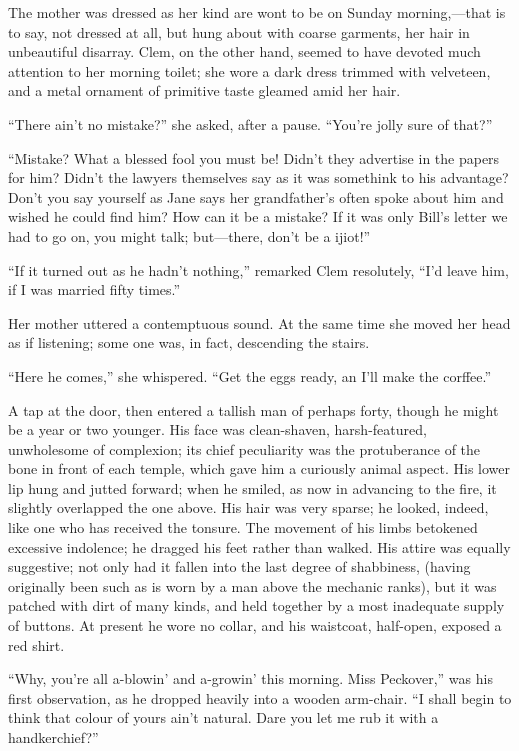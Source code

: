 The mother was dressed as her kind are wont to be on Sunday
morning,---that is to say, not dressed at all, but hung about with
coarse garments, her hair in unbeautiful disarray. Clem, on the other
hand, seemed to have devoted much attention to her morning toilet; she
wore a dark dress trimmed with {}velveteen, and a metal ornament of
primitive taste gleamed amid her hair.

``There ain't no mistake?'' she asked, after a pause. ``You're jolly
sure of that?''

``Mistake? What a blessed fool you must be! Didn't they advertise in the
papers for him? Didn't the lawyers themselves say as it was somethink to
his advantage? Don't you say yourself as Jane says her grandfather's
often spoke about him and wished he could find him? How can it be a
mistake? If it was only Bill's letter we had to go on, you might talk;
but---there, don't be a ijiot!''

``If it turned out as he hadn't nothing,'' remarked Clem resolutely,
``I'd leave him, if I was married fifty times.''

Her mother uttered a contemptuous sound. At the same time she moved her
head as if listening; some one was, in fact, descending the stairs.

``Here he comes,'' she whispered. ``Get the eggs ready, an I'll make the
corffee.''

A tap at the door, then entered a tallish {}man of perhaps forty, though
he might be a year or two younger. His face was clean-shaven,
harsh-featured, unwholesome of complexion; its chief peculiarity was the
protuberance of the bone in front of each temple, which gave him a
curiously animal aspect. His lower lip hung and jutted forward; when he
smiled, as now in advancing to the fire, it slightly overlapped the one
above. His hair was very sparse; he looked, indeed, like one who has
received the tonsure. The movement of his limbs betokened excessive
indolence; he dragged his feet rather than walked. His attire was
equally suggestive; not only had it fallen into the last degree of
shabbiness, (having originally been such as is worn by a man above the
mechanic ranks), but it was patched with dirt of many kinds, and held
together by a most inadequate supply of buttons. At present he wore no
collar, and his waistcoat, half-open, exposed a red shirt.

``Why, you're all a-blowin' and a-growin' this morning. Miss Peckover,''
was his first observation, as he dropped heavily into a {}wooden
arm-chair. ``I shall begin to think that colour of yours ain't natural.
Dare you let me rub it with a handkerchief?''

